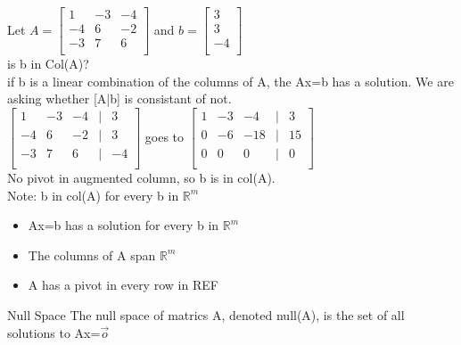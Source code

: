 \begin{ex}
Let $A=
\begin{bmatrix}
   1 & -3 & -4\\
   -4 & 6 & -2\\
   -3 & 7 & 6\\
\end{bmatrix}
$ and $b= 
\begin{bmatrix}
   3 \\
   3 \\
   -4\\
\end{bmatrix}$\\
is b in Col(A)?\\
if b is a linear combination of the columns of A,
the Ax=b has a solution. We are asking whether [A|b] is consistant of not.\\
$
\begin{bmatrix}
   1 & -3 & -4 & | & 3\\
   -4 & 6 & -2 & | & 3\\
   -3 & 7 & 6 & | & -4\\
\end{bmatrix}
$ goes to $
\begin{bmatrix}
   1 & -3 & -4 & | & 3\\
   0 & -6 & -18 & | & 15\\
   0 & 0 & 0 & | & 0\\
\end{bmatrix}
$\\
No pivot in augmented column, so b is in col(A).\\
Note: b in col(A) for every b in $\mathbb{R}^m$\\
\begin{itemize}
    \item Ax=b has a solution for every b in $\mathbb{R}^m$
    \item The columns of A span $\mathbb{R}^m$
    \item A has a pivot in every row in REF
\end{itemize}
\end{ex}
\begin{imp:defn}{Null Space}{} The null space of matrics A, denoted null(A), is the set of all solutions to Ax=$\vec o$
\end{imp:defn}
